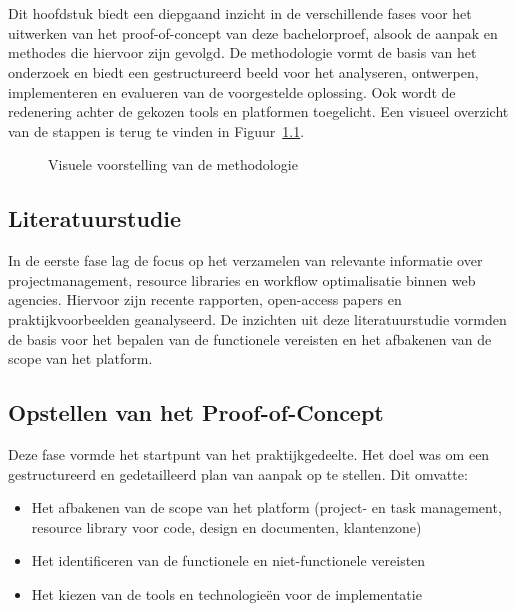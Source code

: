 
\chapter{}
\label{ch:methodologie}

Dit hoofdstuk biedt een diepgaand inzicht in de verschillende fases voor het uitwerken van het proof-of-concept van deze bachelorproef, alsook de aanpak en methodes die hiervoor zijn gevolgd. De methodologie vormt de basis van het onderzoek en biedt een gestructureerd beeld voor het analyseren, ontwerpen, implementeren en evalueren van de voorgestelde oplossing. Ook wordt de redenering achter de gekozen tools en platformen toegelicht. Een visueel overzicht van de stappen is terug te vinden in Figuur~\ref{fig:methodologie-flowchart}.

\begin{figure}[h]
    \centering
    \caption{Visuele voorstelling van de methodologie}
    \label{fig:methodologie-flowchart}
\end{figure}

\section{Literatuurstudie}
In de eerste fase lag de focus op het verzamelen van relevante informatie over projectmanagement, resource libraries en workflow optimalisatie binnen web agencies. Hiervoor zijn recente rapporten, open-access papers en praktijkvoorbeelden geanalyseerd. De inzichten uit deze literatuurstudie vormden de basis voor het bepalen van de functionele vereisten en het afbakenen van de scope van het platform.

\section{Opstellen van het Proof-of-Concept}
Deze fase vormde het startpunt van het praktijkgedeelte. Het doel was om een gestructureerd en gedetailleerd plan van aanpak op te stellen. Dit omvatte:
\begin{itemize}
    \item Het afbakenen van de scope van het platform (project- en task management, resource library voor code, design en documenten, klantenzone)
    \item Het identificeren van de functionele en niet-functionele vereisten
    \item Het kiezen van de tools en technologieën voor de implementatie
\end{itemize}

